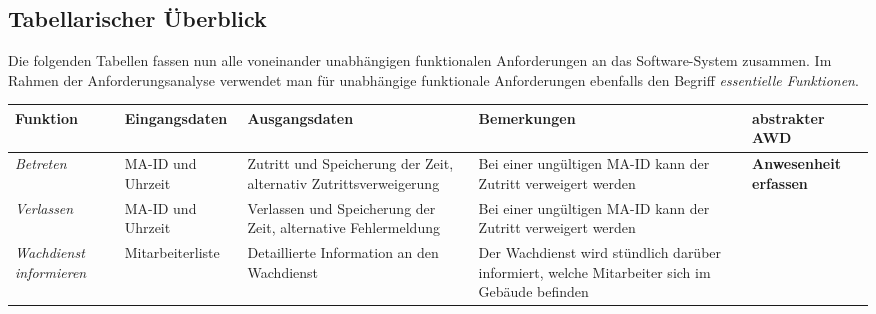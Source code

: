 \subsection{Tabellarischer \"Uberblick}
Die folgenden Tabellen fassen nun alle voneinander unabh\"angigen funktionalen Anforderungen an das Software-System zusammen.  Im Rahmen der Anforderungsanalyse verwendet man f\"ur unabh\"angige funktionale Anforderungen ebenfalls den Begriff  \textit{essentielle Funktionen}.

{
\vspace{1cm}
\hspace{-3,5cm}
\footnotesize
\begin{tabular}{|p{3cm}|p{4cm}|p{4cm}|p{4cm}|p{2cm}|}
	\hline
		\textbf{Funktion	} &	
		\textbf{Eingangsdaten} &
		\textbf{Ausgangsdaten}& 
		\textbf{Bemerkungen}	&
		\textbf{abstrakter AWD} \\
	\hline \hline 
		\textit{Betreten} &
		MA-ID und Uhrzeit &
		Zutritt und Speicherung der Zeit, alternativ Zutrittsverweigerung & 
		Bei einer ung\"ultigen MA-ID kann der Zutritt verweigert werden &  
		\textbf{Anwesenheit erfassen} \\
	\cline{1-4}
		\textit{Verlassen} & 
		MA-ID und Uhrzeit & 
		Verlassen und Speicherung der Zeit, alternative Fehlermeldung &
		Bei einer ung\"ultigen MA-ID kann der Zutritt verweigert werden & 
		\\
	\cline{1-4}
		\textit{Wachdienst \mbox{informieren}} &
		Mitarbeiterliste &
		Detaillierte Information an den Wachdienst &
		Der Wachdienst wird st\"undlich dar\"uber informiert, welche Mitarbeiter sich im Geb\"aude befinden &
		\\
	\hline
\end{tabular}
}

